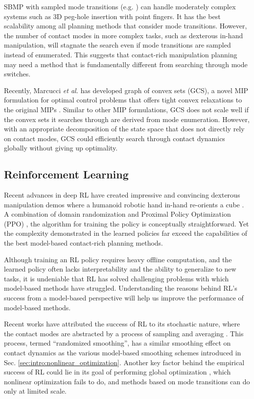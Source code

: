 SBMP with sampled mode transitions (e.g. \cite{cheng2021contact}) can handle moderately complex systems such as 3D peg-hole insertion with point fingers. It has the best scalability among all planning methods that consider mode transitions. However, the number of contact modes in more complex tasks, such as dexterous in-hand manipulation, will stagnate the search even if mode transitions are sampled instead of enumerated. This suggests that contact-rich manipulation planning may need a method that is fundamentally different from searching through mode switches.

Recently, Marcucci \textit{et al.} has developed graph of convex sets (GCS), a novel MIP formulation for optimal control problems that offers tight convex relaxations to the original MIPs \cite{marcucci2021shortest}. Similar to other MIP formulations, GCS does not scale well if the convex sets it searches through are derived from mode enumeration. However, with an appropriate decomposition of the state space that does not directly rely on contact modes, GCS could efficiently search through contact dynamics globally without giving up optimality.


\subsection{Reinforcement Learning}
Recent advances in deep RL have created impressive and convincing dexterous manipulation demos where a humanoid robotic hand in-hand re-orients a cube \cite{andrychowicz2020learning, handa2022dextreme}. A combination of domain randomization \cite{tobin2017domain} and Proximal Policy Optimization (PPO) \cite{schulman2017ppo}, the algorithm for training the policy is conceptually straightforward. Yet the complexity demonstrated in the learned policies far exceed the capabilities of the best model-based contact-rich planning methods. 

Although training an RL policy requires heavy offline computation, and the learned policy often lacks interpretability and the ability to generalize to new tasks, it is undeniable that RL has solved challenging problems with which model-based methods have struggled. Understanding the reasons behind RL's success from a model-based perspective will help us improve the performance of model-based methods. 

Recent works have attributed the success of RL to its stochastic nature, where the contact modes are abstracted by a process of sampling and averaging \cite{bundledgradients, pang2022global}. This process, termed ``randomized smoothing'', has a similar smoothing effect on contact dynamics as the various model-based smoothing schemes introduced in Sec. \ref{sec:intro:nonlinear_optimization}. Another key factor behind the empirical success of RL could lie in its goal of performing global optimization \cite{pang2022global}, which nonlinear optimization fails to do, and methods based on mode transitions can do only at limited scale.

